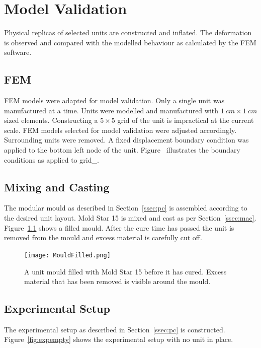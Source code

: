 \chapter{Model Validation}
\label{chp:MV}


Physical replicas of selected units are constructed and inflated. The deformation is observed and compared with the modelled behaviour as calculated by the FEM software.

\section{FEM}

FEM models were adapted for model validation. Only a single unit was manufactured at a time. Units were modelled and manufactured with $\SI{1}{cm}\times \SI{1}{cm}$ sized elements. Constructing a $5\times 5$ grid of the unit is impractical at the current scale. FEM models selected for model validation were adjusted accordingly. Surrounding units were removed. A fixed displacement boundary condition was applied to the bottom left node of the unit. Figure~ illustrates the boundary conditions as applied to grid\_.

\section{Mixing and Casting}

The modular mould as described in Section~\ref{ssec:pc} is assembled according to the desired unit layout. Mold Star 15 is mixed and cast as per Section~\ref{ssec:mac}. Figure~\ref{fig:fillmould} shows a filled mould. After the cure time has passed the unit is removed from the mould and excess material is carefully cut off. 

\begin{figure}[H]
	\centering
	\texttt{[image: MouldFilled.png]}
	\caption[A filled unit mould]{A unit mould filled with Mold Star 15 before it has cured. Excess material that has been removed is visible around the mould.}
	\label{fig:fillmould}
\end{figure}

\section{Experimental Setup}

The experimental setup as described in Section~\ref{ssec:pc} is constructed. Figure~\ref{fig:expempty} shows the experimental setup with no unit in place.

